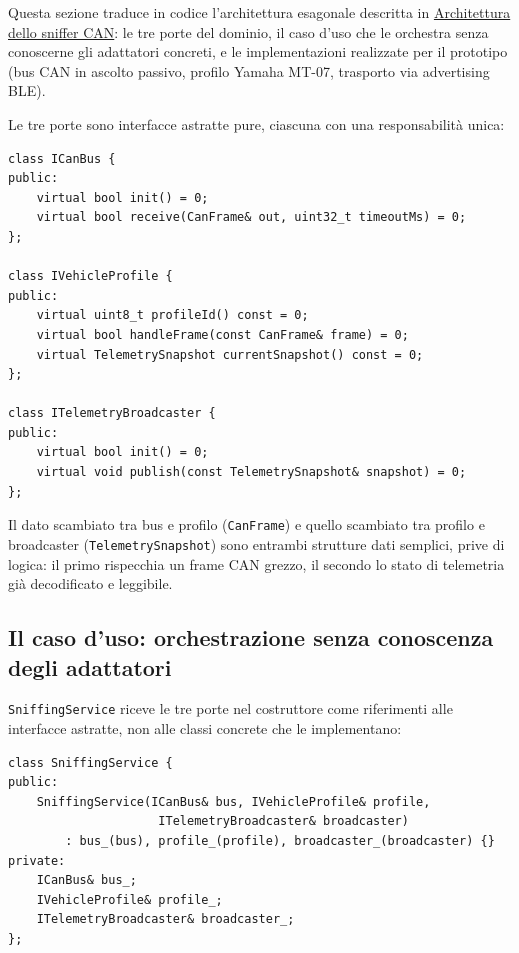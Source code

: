 Questa sezione traduce in codice l'architettura esagonale descritta in
\hyperref[sec:sniffer-arch]{Architettura dello sniffer CAN}: le tre porte del
dominio, il caso d'uso che le orchestra senza conoscerne gli adattatori
concreti, e le implementazioni realizzate per il prototipo (bus CAN in
ascolto passivo, profilo Yamaha MT-07, trasporto via advertising BLE).

Le tre porte sono interfacce astratte pure, ciascuna con una responsabilità
unica:

\begin{listing}[H]
\begin{verbatim}
class ICanBus {
public:
    virtual bool init() = 0;
    virtual bool receive(CanFrame& out, uint32_t timeoutMs) = 0;
};

class IVehicleProfile {
public:
    virtual uint8_t profileId() const = 0;
    virtual bool handleFrame(const CanFrame& frame) = 0;
    virtual TelemetrySnapshot currentSnapshot() const = 0;
};

class ITelemetryBroadcaster {
public:
    virtual bool init() = 0;
    virtual void publish(const TelemetrySnapshot& snapshot) = 0;
};
\end{verbatim}
\caption{Le tre porte del dominio}
\label{listing:sniffer-ports}
\end{listing}

Il dato scambiato tra bus e profilo (\texttt{CanFrame}) e quello scambiato
tra profilo e broadcaster (\texttt{TelemetrySnapshot}) sono entrambi
strutture dati semplici, prive di logica: il primo rispecchia un frame CAN
grezzo, il secondo lo stato di telemetria già decodificato e leggibile.

\subsection{Il caso d'uso: orchestrazione senza conoscenza degli adattatori}
\texttt{SniffingService} riceve le tre porte nel costruttore come riferimenti
alle interfacce astratte, non alle classi concrete che le implementano:

\begin{listing}[H]
\begin{verbatim}
class SniffingService {
public:
    SniffingService(ICanBus& bus, IVehicleProfile& profile,
                     ITelemetryBroadcaster& broadcaster)
        : bus_(bus), profile_(profile), broadcaster_(broadcaster) {}
private:
    ICanBus& bus_;
    IVehicleProfile& profile_;
    ITelemetryBroadcaster& broadcaster_;
};
\end{verbatim}
\caption{Costruzione del caso d'uso tramite le sole interfacce di dominio}
\label{listing:sniffer-service-ctor}
\end{listing}

